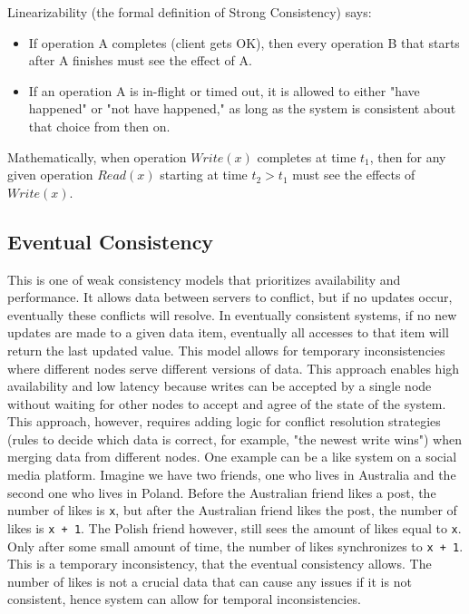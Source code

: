 \documentclass[shortabstract]{iithesis}
\begin{document}
Linearizability (the formal definition of Strong Consistency) says:
\begin{itemize}
    \item If operation A completes (client gets OK), then every operation B that starts after A finishes must see the effect of A.
    \item If an operation A is in-flight or timed out, it is allowed to either "have happened" or "not have happened," as long as the system is consistent about that choice from then on.
\end{itemize}

Mathematically, when operation $Write(x)$ completes at time $t_1$, then for any given operation $Read(x)$ starting at time $t_2 > t_1$ must see the effects of $Write(x)$.

\subsection{Eventual Consistency}
This is one of weak consistency models that prioritizes availability and performance. It allows data between servers to conflict, but if no updates occur, eventually these conflicts will resolve.
In eventually consistent systems, if no new updates are made to a given data item, eventually all accesses to that item will return the last updated value. This model allows for temporary inconsistencies where different nodes serve different versions of data.
This approach enables high availability and low latency because writes can be accepted by a single node without waiting for other nodes to accept and agree of the state of the system. This approach, however, requires adding logic for conflict resolution strategies (rules to decide which data is correct, for example, "the newest write wins") when merging data from different nodes.
One example can be a like system on a social media platform. Imagine we have two friends, one who lives in Australia and the second one who lives in Poland. Before the Australian friend likes a post, the number of likes is \texttt{x}, but after the Australian friend likes the post, the number of likes is \texttt{x + 1}. The Polish friend however, still sees the amount of likes equal to \texttt{x}. Only after some small amount of time, the number of likes synchronizes to \texttt{x + 1}. This is a temporary inconsistency, that the eventual consistency allows. The number of likes is not a crucial data that can cause any issues if it is not consistent, hence system can allow for temporal inconsistencies.
\end{document}
